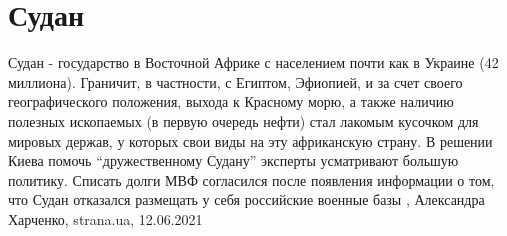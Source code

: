  
 
 
 
 
\chapter{Судан}

Судан - государство в Восточной Африке с населением почти как в Украине (42
миллиона). Граничит, в частности, с Египтом, Эфиопией, и за счет своего
географического положения, выхода к Красному морю, а также наличию полезных
ископаемых (в первую очередь нефти) стал лакомым кусочком для мировых держав, у
которых свои виды на эту африканскую страну.  В решении Киева помочь
\enquote{дружественному Судану} эксперты усматривают большую политику. Списать долги
МВФ согласился после появления информации о том, что Судан отказался размещать
у себя российские военные базы
, 
Александра Харченко, strana.ua, 12.06.2021

